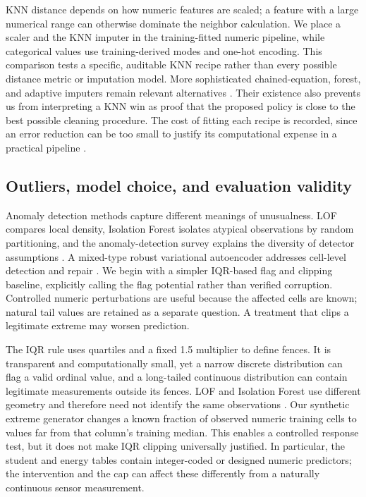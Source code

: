 \documentclass[conference]{IEEEtran}
\begin{document}
KNN distance depends on how numeric features are scaled; a feature with a large numerical range can otherwise dominate the neighbor calculation. We place a scaler and the KNN imputer in the training-fitted numeric pipeline, while categorical values use training-derived modes and one-hot encoding. This comparison tests a specific, auditable KNN recipe rather than every possible distance metric or imputation model. More sophisticated chained-equation, forest, and adaptive imputers remain relevant alternatives \cite{vanBuuren2011,Stekhoven2012,Jarrett2022}. Their existence also prevents us from interpreting a KNN win as proof that the proposed policy is close to the best possible cleaning procedure. The cost of fitting each recipe is recorded, since an error reduction can be too small to justify its computational expense in a practical pipeline \cite{Neutatz2022}.

\subsection{Outliers, model choice, and evaluation validity}
Anomaly detection methods capture different meanings of unusualness. LOF compares local density, Isolation Forest isolates atypical observations by random partitioning, and the anomaly-detection survey explains the diversity of detector assumptions \cite{Breunig2000,Liu2008,Chandola2009}. A mixed-type robust variational autoencoder addresses cell-level detection and repair \cite{Eduardo2020}. We begin with a simpler IQR-based flag and clipping baseline, explicitly calling the flag potential rather than verified corruption. Controlled numeric perturbations are useful because the affected cells are known; natural tail values are retained as a separate question. A treatment that clips a legitimate extreme may worsen prediction.

The IQR rule uses quartiles and a fixed 1.5 multiplier to define fences. It is transparent and computationally small, yet a narrow discrete distribution can flag a valid ordinal value, and a long-tailed continuous distribution can contain legitimate measurements outside its fences. LOF and Isolation Forest use different geometry and therefore need not identify the same observations \cite{Breunig2000,Liu2008}. Our synthetic extreme generator changes a known fraction of observed numeric training cells to values far from that column's training median. This enables a controlled response test, but it does not make IQR clipping universally justified. In particular, the student and energy tables contain integer-coded or designed numeric predictors; the intervention and the cap can affect these differently from a naturally continuous sensor measurement.
\end{document}
